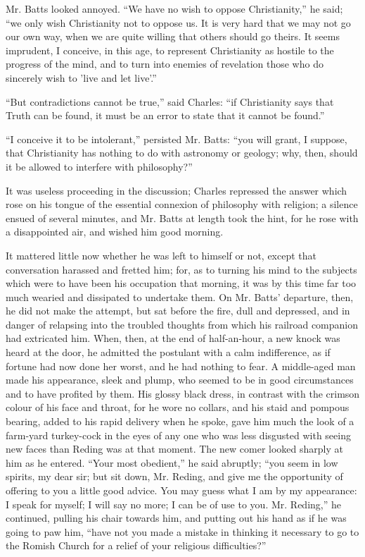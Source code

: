 Mr. Batts looked annoyed. ``We have no wish to oppose
Christianity,'' he said; ``we only wish Christianity not to
oppose us. It is very hard that we may not go our own way, when we are
quite willing that others should go theirs. It seems imprudent, I
conceive, in this age, to represent Christianity as hostile to the
progress of the mind, and to turn into enemies of revelation those who
do sincerely wish to 'live and let live'.''

``But contradictions cannot be true,'' said Charles:
``if Christianity says that Truth can be found, it must be an
error to state that it cannot be found.''

``I conceive it to be intolerant,'' persisted Mr. Batts:
``you will grant, I suppose, that Christianity has nothing to do
with astronomy or geology; why, then, should it be allowed to
interfere with philosophy?''

It was useless proceeding in the discussion; Charles repressed the
answer which rose on his tongue of the essential connexion of
philosophy with religion; a silence ensued of several minutes, and Mr.
Batts at length took the hint, for he rose with a disappointed air,
and wished him good morning.

It mattered little now whether he was left to himself or not,
except that conversation harassed and fretted him; for, as to turning
his mind to the subjects which were to have been his occupation that
morning, it was by this time far too much wearied and dissipated to
undertake them. On Mr. Batts' departure, then, he did not make the
attempt, but sat before the fire, dull and depressed, and in danger of
relapsing into the troubled thoughts from which his railroad companion
had extricated him. When, then, at the end of half-an-hour, a
new knock was heard at the door, he admitted the postulant with a calm
indifference, as if fortune had now done her worst, and he had nothing
to fear. A middle-aged man made his appearance, sleek and plump, who
seemed to be in good circumstances and to have profited by them. His
glossy black dress, in contrast with the crimson colour of his face
and throat, for he wore no collars, and his staid and pompous bearing,
added to his rapid delivery when he spoke, gave him much the look of a
farm-yard turkey-cock in the eyes of any one who was less disgusted
with seeing new faces than Reding was at that moment. The new comer
looked sharply at him as he entered. ``Your most obedient,''
he said abruptly; ``you seem in low spirits, my dear sir; but sit
down, Mr. Reding, and give me the opportunity of offering to you a
little good advice. You may guess what I am by my appearance: I speak
for myself; I will say no more; I can be of use to you. Mr. Reding,''
he continued, pulling his chair towards him, and putting out his hand
as if he was going to paw him, ``have not you made a mistake in
thinking it necessary to go to the Romish Church for a relief of your
religious difficulties?''


